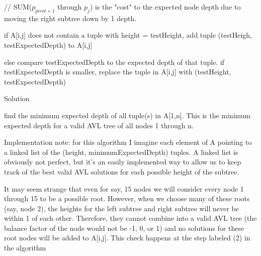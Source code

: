 \documentclass[a4paper]{article}
\begin{document}
\begin{myEnumerate}
\begin{myEnumerate}
\begin{myEnumerate}
\begin{myEnumerate}
\begin{myEnumerate}
\begin{myEnumerate}
\begin{myEnumerate}
                \item // SUM($p_{pivot+1}$ through $p_{j}$) is the "cost" to the expected node depth due to moving the right subtree down by 1 depth.
                \item if A[i,j] does not contain a tuple with height = testHeight, add tuple (testHeigh, testExpectedDepth) to A[i,j]
                \item else compare testExpectedDepth to the expected depth of that tuple. if testExpectedDepth is smaller, replace the tuple in A[i,j] with (testHeight, testExpectedDepth)
                \end{myEnumerate}
            \end{myEnumerate}
        \end{myEnumerate}
    \end{myEnumerate}
\end{myEnumerate}
\end{myEnumerate}
\end{myEnumerate}
                        
Solution
\begin{myEnumerate}
\item  find the minimum expected depth of all tuple(s) in A[1,n]. This is the minimum expected depth for a valid AVL tree of all nodes 1 through n.
\end{myEnumerate}

Implementation note: for this algorithm I imagine each element of A pointing to a linked list of the (height, minimumExpectedDepth) tuples. A linked list is obviously not perfect, but it's an easily implemented way to allow us to keep track of the best valid AVL solutions for each possible height of the subtree.

It may seem strange that even for say, 15 nodes we will consider every node 1 through 15 to be a possible root. However, when we choose many of these roots (say, node 2), the heights for the left subtree and right subtree will never be within 1 of each other. Therefore, they cannot combine into a valid AVL tree (the balance factor of the node would not be -1, 0, or 1) and no solutions for these root nodes will be added to A[i,j].
This check happens at the step labeled (2) in the algorithm
\end{document}
